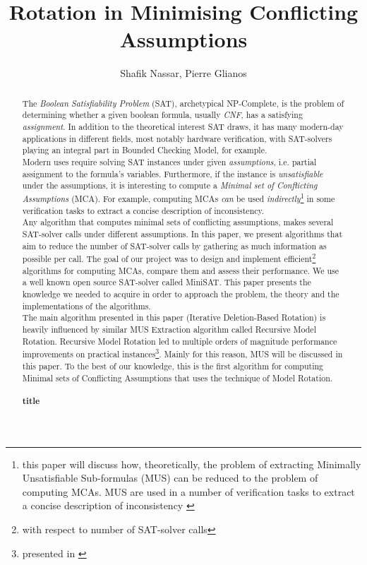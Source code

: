\documentclass[]{article}
\title{Rotation in Minimising Conflicting Assumptions}
\author{Shafik Nassar, Pierre Glianos}
\begin{document}
	
	\maketitle
	
	\begin{abstract}
		
		The \textit{Boolean Satisfiability Problem} (SAT), archetypical NP-Complete, is the problem of determining whether a given boolean formula, usually \textit{CNF}, has a satisfying \textit{assignment}. In addition to the theoretical interest SAT draws, it has many modern-day applications in different fields, most notably hardware verification, with SAT-solvers playing an integral part in Bounded Checking Model, for example.\\
		Modern uses require solving SAT instances under given \textit{assumptions}, i.e. partial assignment to the formula's variables. Furthermore, if the instance is \textit{unsatisfiable} under the assumptions, it is interesting to compute a \textit{Minimal set of Conflicting Assumptions} (MCA). For example, computing MCAs \textit{can} be used \textit{indirectly}\footnote{this paper will discuss how, theoretically, the problem of extracting Minimally Unsatisfiable Sub-formulas (MUS) can be reduced to the problem of computing MCAs.  MUS are used in a number of verification tasks to extract a concise description of inconsistency \cite{MUSRMR}} in some verification tasks to extract a concise description of inconsistency.\\
		Any algorithm that computes minimal sets of conflicting assumptions, makes several SAT-solver calls under different assumptions. In this paper, we present algorithms that aim to reduce the number of SAT-solver calls by gathering as much information as possible per call.
		The goal of our project was to design and implement efficient\footnote{with respect to number of SAT-solver calls} algorithms for computing MCAs, compare them and assess their performance. We use a well known open source SAT-solver called MiniSAT. This paper presents the knowledge we needed to acquire in order to approach the problem, the theory and the implementations of the algorithms. \\
		The main algorithm presented in this paper (Iterative Deletion-Based Rotation) is heavily influenced by similar MUS Extraction algorithm called Recursive Model Rotation. Recursive Model Rotation led to multiple orders of magnitude performance improvements on practical instances\footnote{presented in \cite{MUSRMR}}. Mainly for this reason, MUS will be discussed in this paper. To the best of our knowledge, this is the first algorithm for computing Minimal sets of Conflicting Assumptions that uses the technique of Model Rotation.
		
		\paragraph{title}
		
	\end{abstract}
	
\end{document}
